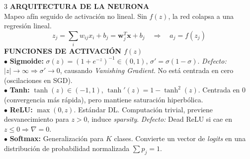 \documentclass[8pt,a4paper,landscape,fleqn]{extarticle}
\begin{document}
\begin{multicols*}{3}
\textbf{ARQUITECTURA DE LA NEURONA}\\
Mapeo afín seguido de activación no lineal. Sin $f(z)$, la red colapsa a una regresión lineal.
$$
    z_j = \sum_{i} w_{ij} x_i + b_j = \bm{w}_j^T \bm{x} + b_j \quad \Rightarrow \quad a_j = f(z_j)
$$
\textbf{FUNCIONES DE ACTIVACIÓN $f(z)$}\\
$\bullet$ \textbf{Sigmoide:} $\sigma(z) = (1+e^{-z})^{-1} \in (0,1)$, $ \sigma ' = \sigma(1-\sigma)$. \textit{Defecto:} $|z| \to \infty \Rightarrow \sigma' \to 0$, causando \textit{Vanishing Gradient}. No está centrada en cero (oscilaciones en SGD).\\
$\bullet$ \textbf{Tanh:} $\tanh(z) \in (-1,1)$, $\tanh'(z) = 1-\tanh^2(z)$. Centrada en 0 (convergencia más rápida), pero mantiene saturación hiperbólica.\\
$\bullet$ \textbf{ReLU:} $\max(0,z)$. Estándar DL. Computación trivial, previene desvanecimiento para $z>0$, induce \textit{sparsity}. \textit{Defecto:} Dead ReLU si cae en $z \le 0 \Rightarrow \nabla=0$.\\
$\bullet$ \textbf{Softmax:} Generalización para $K$ clases. Convierte un vector de \textit{logits} en una distribución de probabilidad normalizada $\sum p_j = 1$.
\begin{center}
\end{center}
\end{multicols*}
\end{document}
